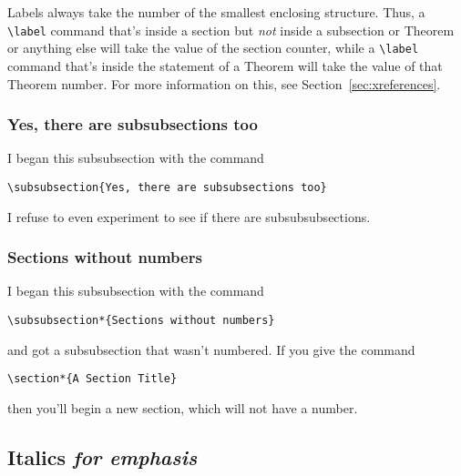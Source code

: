 Labels always take the number of the smallest enclosing structure.
Thus, a \verb"\label" command that's inside a section but {\em not\/}
inside a subsection or Theorem or anything else will take the value
of the section counter, while a \verb"\label" command that's inside
the statement of a Theorem will take the value of that Theorem
number.  For more information on this, see Section~\ref{sec:xreferences}.

\subsubsection{Yes, there are subsubsections too}

I began this subsubsection with the command
\begin{center}
\verb"\subsubsection{Yes, there are subsubsections too}"
\end{center}
I refuse to even experiment to see if there are subsubsubsections.



\subsubsection*{Sections without numbers}

I began this subsubsection with the command
\begin{verbatim}
\subsubsection*{Sections without numbers}
\end{verbatim}
and got a subsubsection that wasn't numbered.  If you give the
command
\begin{verbatim}
\section*{A Section Title}
\end{verbatim}
then you'll begin a new section, which will not have a number.





\subsection{Italics {\em for emphasis\/}}

